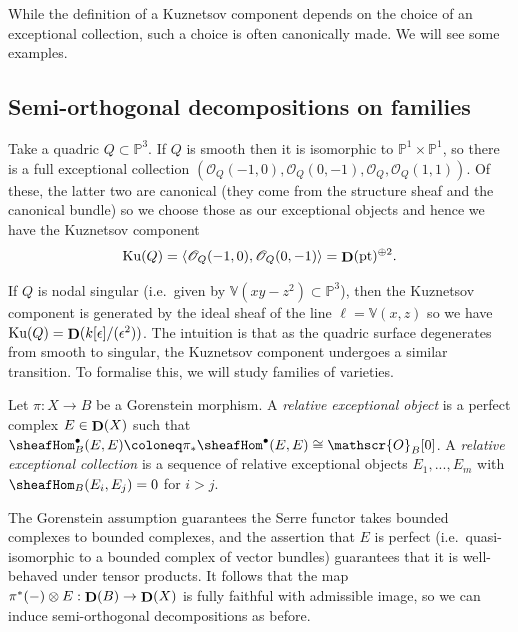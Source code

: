 While the definition of a Kuznetsov component depends on the choice of an
exceptional collection, such a choice is often canonically made. We will see
some examples.


\subsection{Semi-orthogonal decompositions on families} Take a quadric
\(Q\subset \mathbb{P}^3\). If \(Q\) is smooth then it is isomorphic to
\(\mathbb{P}^1\times \mathbb{P}^1\), so there is a full exceptional collection
\((\mathscr{O}_Q(-1,0), \mathscr{O}_Q(0,-1), \mathscr{O}_Q, \mathscr{O}_Q(1,1))\). Of these, the latter two are canonical (they come from the structure sheaf and the canonical bundle) so we choose those as
our exceptional objects and hence we have the Kuznetsov component
\[\text{Ku}(Q)=\langle \mathscr{O}_Q(-1,0),\mathscr{O}_Q(0,-1)
\rangle=\mathop{\mathbf{D}}(\text{pt})^{\oplus 2}.\]

If \(Q\) is nodal singular (i.e.\ given by \(\mathbb{V}(xy-z^2)\subset
\mathbb{P}^3\)), then the Kuznetsov component is generated by the ideal sheaf of
the line \(\ell=\mathbb{V}(x,z)\) so we have
\(\text{Ku}(Q)=\mathop{\mathbf{D}}(k[\epsilon]/(\epsilon^2))\).  The intuition is that as the
quadric surface degenerates from smooth to singular, the Kuznetsov component
undergoes a similar transition.  To formalise this, we will study families of
varieties.

\begin{definition}
    Let \(\pi:X\to B\) be a Gorenstein morphism. A \textit{relative
    exceptional object} is a perfect complex \(E\in \mathop{\mathbf{D}}(X)\) such that
    \(\sheafHom_B^\bullet(E,E)\coloneq \pi_\ast \sheafHom^\bullet(E,E)\cong
    \mathscr{O}_B[0]\). A \textit{relative exceptional collection} is a sequence
    of relative exceptional objects \(E_1,...,E_m\) with
    \(\sheafHom_B(E_i,E_j)=0\) for \(i>j\).
\end{definition}

The Gorenstein assumption guarantees the Serre functor takes bounded complexes
to bounded complexes, and the assertion that \(E\) is perfect (i.e.\
quasi-isomorphic to a bounded complex of vector bundles) guarantees that it is
well-behaved under tensor products. It follows that the map \(\pi^\ast(-)\otimes
E:\mathop{\mathbf{D}}(B)\to \mathop{\mathbf{D}}(X)\) is fully faithful with admissible image, so
we can induce semi-orthogonal decompositions as before.

